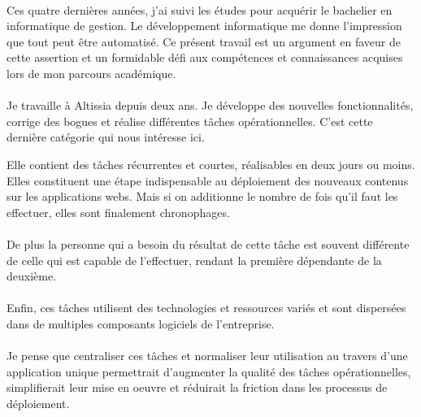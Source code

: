 \paragraph{}
Ces quatre dernières années, j'ai suivi les études pour acquérir le bachelier en informatique de gestion.
Le développement informatique me donne l'impression que tout peut être automatisé.
Ce présent travail est un argument en faveur de cette assertion et un formidable défi aux compétences et connaissances acquises lors de mon parcours académique.

\paragraph{}
Je travaille à Altissia depuis deux ans.
Je développe des nouvelles fonctionnalités, corrige des bogues et réalise différentes tâches opérationnelles.
C'est cette dernière catégorie qui nous intéresse ici.

Elle contient des tâches récurrentes et courtes, réalisables en deux jours ou moins.
Elles constituent une étape indispensable au déploiement des nouveaux contenus sur les applications webs.
Mais si on additionne le nombre de fois qu'il faut les effectuer, elles sont finalement chronophages.

\paragraph{}
De plus la personne qui a besoin du résultat de cette tâche est souvent différente de celle qui est capable de l'effectuer, rendant la première dépendante de la deuxième.

\paragraph{}
Enfin, ces tâches utilisent des technologies et ressources variés et sont dispersées dans de multiples composants logiciels de l'entreprise.

\paragraph{}
Je pense que centraliser ces tâches et normaliser leur utilisation au travers d'une application unique permettrait d'augmenter la qualité des tâches opérationnelles, simplifierait leur mise en oeuvre et réduirait la friction dans les processus de déploiement.
